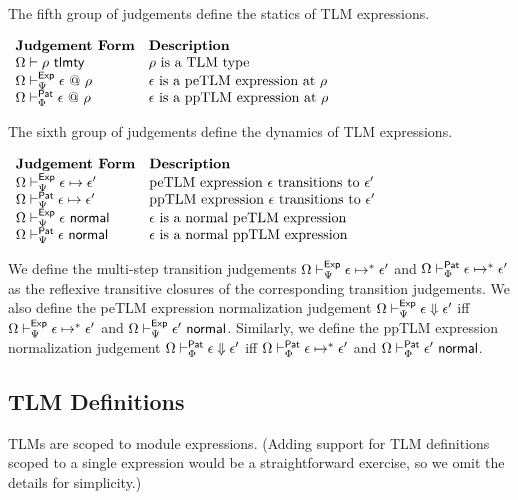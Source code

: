 The fifth group of judgements define the statics of TLM expressions.

\vspace{6px}
$\begin{array}{ll}
\textbf{Judgement Form} & \textbf{Description}\\
\Omega \vdash \rho~\mathsf{tlmty} & \text{$\rho$ is a TLM type}\\
\Omega \vdash_{\Psi}^{\mathsf{Exp}} \epsilon ~@~ \rho & \text{$\epsilon$ is a peTLM expression at $\rho$}\\
\Omega \vdash_{\Phi}^{\mathsf{Pat}} \epsilon ~@~ \rho & \text{$\epsilon$ is a ppTLM expression at $\rho$}
\end{array}$
\vspace{6px}

The sixth group of judgements define the dynamics of TLM expressions.

\vspace{6px}
$\begin{array}{ll}
\textbf{Judgement Form} & \textbf{Description}\\
\Omega \vdash_{\Psi}^\mathsf{Exp} \epsilon \mapsto \epsilon' & \text{peTLM expression $\epsilon$ transitions to $\epsilon'$}\\
\Omega \vdash_{\Psi}^\mathsf{Pat} \epsilon \mapsto \epsilon' & \text{ppTLM expression $\epsilon$ transitions to $\epsilon'$}\\
\Omega \vdash_{\Psi}^\mathsf{Exp} \epsilon~\mathsf{normal} & \text{$\epsilon$ is a normal peTLM expression}\\
\Omega \vdash_{\Psi}^\mathsf{Pat} \epsilon~\mathsf{normal} & \text{$\epsilon$ is a normal ppTLM expression}
\end{array}$
\vspace{6px}

We define the multi-step transition judgements $\Omega \vdash_{\Psi}^\mathsf{Exp} \epsilon \mapsto^{*} \epsilon'$ and $\Omega \vdash_{\Phi}^\mathsf{Pat} \epsilon \mapsto^{*} \epsilon'$ as the reflexive transitive closures of the corresponding transition judgements. We also define the peTLM expression normalization judgement $\Omega \vdash_{\Psi}^\mathsf{Exp} \epsilon \Downarrow \epsilon'$ iff $\Omega \vdash_{\Psi}^\mathsf{Exp} \epsilon \mapsto^{*} \epsilon'$ and $\Omega \vdash_{\Psi}^\mathsf{Exp} \epsilon'~\mathsf{normal}$. Similarly, we define the ppTLM expression normalization judgement $\Omega \vdash_{\Phi}^\mathsf{Pat} \epsilon \Downarrow \epsilon'$ iff $\Omega \vdash_{\Phi}^\mathsf{Pat} \epsilon \mapsto^{*} \epsilon'$ and $\Omega \vdash_{\Phi}^\mathsf{Pat} \epsilon'~\mathsf{normal}$.

\subsection{TLM Definitions}
TLMs are scoped to module expressions. (Adding support for TLM definitions scoped to a single expression would be a straightforward exercise, so we omit the details for simplicity.)

